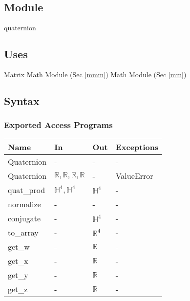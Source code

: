 \documentclass[12pt, titlepage]{article}
\begin{document}
\subsection{Module}
quaternion

\subsection{Uses}
Matrix Math Module (Sec \ref{mmm}) \newline
Math Module (Sec \ref{mm})

\subsection{Syntax}

\subsubsection{Exported Access Programs}

\begin{center}
\begin{tabular}{p{2.5cm} p{5.5cm} p{2cm} p{2cm}}
\hline
\textbf{Name} & \textbf{In} & \textbf{Out} & \textbf{Exceptions} \\
\hline
Quaternion & - & - & - \\
Quaternion & $\mathbb{R}, \mathbb{R}, \mathbb{R}, \mathbb{R}$ & - & ValueError \\
quat\_prod & $\mathbb{H}^4, \mathbb{H}^4$ & $\mathbb{H}^4$ & - \\
normalize & - & - & - \\
conjugate & - & $ \mathbb{H}^4$ & - \\
to\_array & - & $\mathbb{R}^4$ & - \\
get\_w & - & $\mathbb{R}$ & - \\
get\_x & - & $\mathbb{R}$ & - \\
get\_y & - & $\mathbb{R}$ & - \\
get\_z & - & $\mathbb{R}$ & - \\
\hline
\end{tabular}
\end{center}
\end{document}
